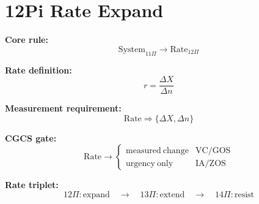 \section*{12Pi Rate Expand}

\textbf{Core rule:}
\[
\mathrm{System}_{11\Pi}
\rightarrow
\mathrm{Rate}_{12\Pi}
\]

\textbf{Rate definition:}
\[
r = \frac{\Delta X}{\Delta n}
\]

\textbf{Measurement requirement:}
\[
\mathrm{Rate} \Rightarrow \{\Delta X,\Delta n\}
\]

\textbf{CGCS gate:}
\[
\mathrm{Rate} \rightarrow
\begin{cases}
\mathrm{measured\ change} & \text{VC/GOS} \\
\mathrm{urgency\ only} & \text{IA/ZOS}
\end{cases}
\]

\textbf{Rate triplet:}
\[
12\Pi:\mathrm{expand}
\quad\rightarrow\quad
13\Pi:\mathrm{extend}
\quad\rightarrow\quad
14\Pi:\mathrm{resist}
\]
